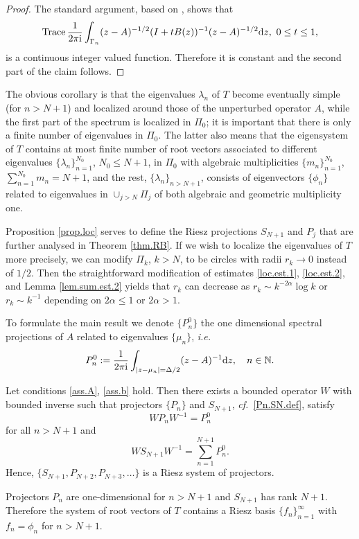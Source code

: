 \begin{proof}
The standard argument, based on \cite[Lem.VII.6.7]{DS1}, shows that 
\begin{equation*}
{\rm Trace} \, \frac{1}{2\pi {{\rm i}}} \int_{\Gamma_n} (z-A)^{-1/2}(I+t B(z))^{-1} (z-A)^{-1/2} {{{\rm d}}} z, \ 0 \leq t \leq 1,   
\end{equation*}
is a continuous integer valued function. Therefore it is constant and the second part of the claim follows.
\end{proof}

The obvious corollary is that the eigenvalues $\lambda_n$ of $T$ become eventually simple (for $n > N+1$) and localized around those of the unperturbed operator $A$, while the first part of the spectrum is localized in $\Pi_0$; it is important that there is only a finite number of eigenvalues in $\Pi_0$. The latter also means that the eigensystem of $T$ contains at most finite number of root vectors associated to different eigenvalues $\{\lambda_n\}_{n=1}^{N_0}$, $N_0 \leq N+1$, in $\Pi_0$ with algebraic multiplicities $\{m_n\}_{n=1}^{N_0}$, $\sum_{n=1}^{N_0} m_n = N+1$, and the rest, $\{\lambda_n\}_{n>N+1}$, consists of eigenvectors $\{\phi_n\}$ related to eigenvalues in $\cup_{j>N}\Pi_j$ of both algebraic and geometric multiplicity one. 

\begin{remark}
Proposition \ref{prop.loc} serves to define the Riesz projections $S_{N+1}$ and $P_j$ that are further analysed in Theorem \ref{thm.RB}. If we wish to localize the eigenvalues of $T$ more precisely, we can modify $\Pi_k$, $k>N$, to be circles with radii $r_k \to 0$ instead of $1/2$. Then the straightforward modification of estimates \eqref{loc.est.1}, \eqref{loc.est.2}, and Lemma \ref{lem.sum.est.2} yields that $r_k$ can decrease as $r_k \sim k^{-2\alpha} \log k$ or $r_k \sim k^{-1}$ depending on $2\alpha \leq 1$ or $2\alpha >1$.
\end{remark}

To formulate the main result we denote $\{P_n^0\}$ the one dimensional spectral projections of $A$ related to eigenvalues $\{\mu_n\}$, {{\emph{i.e.}}}~ 
\begin{equation*}\label{sp.proj.A}
P_n^0  := \frac{1}{2\pi {{\rm i}}} \int_{|z-\mu_n|=\Delta/2}(z-A)^{-1} {{{\rm d}}} z, \quad n \in {\mathbb{N}}.
\end{equation*}

\begin{theorem}\label{thm.RB}
Let conditions \eqref{ass.A}, \eqref{ass.b} hold. 
Then there exists a bounded operator $W$ with bounded inverse such that projectors $\{P_n\}$ and $S_{N+1}$, {\emph{cf.}}~\eqref{Pn.SN.def}, satisfy 
$$
W P_n W^{-1} = P_n^0
$$
for all $n > N+1$ and 
$$
W S_{N+1} W^{-1} = \sum_{n=1}^{N+1} P_n^0.
$$
Hence, $\{S_{N+1},P_{N+2},P_{N+3},\dots\}$ is a Riesz system of projectors.
\end{theorem}
\begin{remark}
Projectors $P_n$ are one-dimensional for $n>N+1$ and $S_{N+1}$ has rank $N+1$. Therefore the system of root vectors of $T$ contains a Riesz basis $\{f_n\}_{n=1}^{\infty}$ with $f_n = \phi_n$ for $n>N+1$.
\end{remark}


